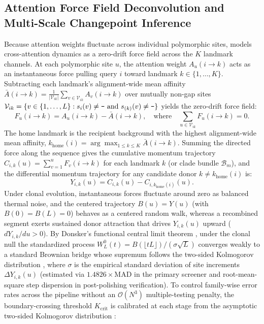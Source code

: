 \subsection{Attention Force Field Deconvolution and Multi-Scale Changepoint Inference}
\label{subsec:methods_changepoints}
\label{subsec:methods_force_field}
Because attention weights fluctuate across individual polymorphic sites, \RhizAeon models cross-attention dynamics as a zero-drift force field across the $K$ landmark channels. At each polymorphic site $u$, the attention weight $A_u(i \to k)$ acts as an instantaneous force pulling query $i$ toward landmark $k \in \{1, \dots, K\}$. Subtracting each landmark's alignment-wide mean affinity $\bar{A}(i \to k) = \frac{1}{|\mathcal{V}_{ik}|}\sum_{v \in \mathcal{V}_{ik}} A_v(i \to k)$ over mutually non-gap sites $\mathcal{V}_{ik} = \{v \in \{1,\dots,L\} : s_i(v) \neq \text{\texttt{-}} \text{ and } s_{(k)}(v) \neq \text{\texttt{-}}\}$ yields the zero-drift force field:
\begin{equation}
F_u(i \to k) = A_u(i \to k) - \bar{A}(i \to k), \quad \text{where} \quad \sum_{u \in \mathcal{V}_{ik}} F_u(i \to k) = 0.
\label{eq:methods_force_field}
\end{equation}
The home landmark is the recipient background with the highest alignment-wide mean affinity, $k_{\text{home}}(i) = \arg\max_{1 \le k \le K} \bar{A}(i \to k)$. Summing the directed force along the sequence gives the cumulative momentum trajectory $C_{i, k}(u) = \sum_{v=1}^u F_v(i \to k)$ for each landmark $k$ (or clade bundle $\mathcal{B}_m$), and the differential momentum trajectory for any candidate donor $k \neq k_{\text{home}}(i)$ is:
\begin{equation}
Y_{i, k}(u) = C_{i, k}(u) - C_{i, k_{\text{home}}(i)}(u).
\label{eq:methods_diff_trajectory}
\end{equation}
Under clonal evolution, instantaneous forces fluctuate around zero as balanced thermal noise, and the centered trajectory $B(u) = Y(u)$ (with $B(0) = B(L) = 0$) behaves as a centered random walk, whereas a recombined segment exerts sustained donor attraction that drives $Y_{i,k}(u)$ upward ($dY_{i,k}/du > 0$). By Donsker's functional central limit theorem \citep{donsker1951invariance}, under the clonal null the standardized process $W_L^0(t) = B(\lfloor t L \rfloor) / (\sigma \sqrt{L})$ converges weakly to a standard Brownian bridge whose supremum follows the two-sided Kolmogorov distribution \citep{kolmogorov1933sulla}, where $\sigma$ is the empirical standard deviation of site increments $\Delta Y_{i,k}(u)$ (estimated via $1.4826 \times \mathrm{MAD}$ in the primary screener and root-mean-square step dispersion in post-polishing verification). To control family-wise error rates across the pipeline without an $\mathcal{O}(N^3)$ multiple-testing penalty, the boundary-crossing threshold $K_{\text{crit}}$ is calibrated at each stage from the asymptotic two-sided Kolmogorov distribution \citep{kolmogorov1933sulla,donsker1951invariance}:
